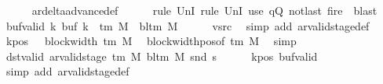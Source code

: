 \begin{isabellebody}
\ \ \ \ \isamarkupfalse%
\ ar{\isacharunderscore}{\kern0pt}delta{\isacharunderscore}{\kern0pt}advance{\isacharunderscore}{\kern0pt}def\isanewline
\ \ \ \ \isamarkupfalse%
\ {\isacharparenleft}{\kern0pt}rule\ UnI{}{\isacharcomma}{\kern0pt}\ rule\ UnI{}{\isacharparenright}{\kern0pt}\ {\isacharparenleft}{\kern0pt}use\ qQ\ notlast\ fire{\isacharprime}{\kern0pt}\ \ blast{\isacharparenright}{\kern0pt}\isanewline
\ \ \isamarkupfalse%
\ buf{\isacharunderscore}{\kern0pt}valid{\isacharcolon}{\kern0pt}\ {\isachardoublequoteopen}{\isasymforall}k{\isachardot}{\kern0pt}\ buf\ k\ {\isasymin}\ {\isasymGamma}{\isacharunderscore}{\kern0pt}tm\ M\ {\isasymunion}\ {\isacharbraceleft}{\kern0pt}bl{\isacharunderscore}{\kern0pt}tm\ M{\isacharbraceright}{\kern0pt}{\isachardoublequoteclose}\isanewline
\ \ \ \ \isamarkupfalse%
\ vsrc\ \isamarkupfalse%
\ {\isacharparenleft}{\kern0pt}simp\ add{\isacharcolon}{\kern0pt}\ ar{\isacharunderscore}{\kern0pt}valid{\isacharunderscore}{\kern0pt}stage{\isacharunderscore}{\kern0pt}def{\isacharparenright}{\kern0pt}\isanewline
\ \ \isamarkupfalse%
\ kpos{\isacharcolon}{\kern0pt}\ {\isachardoublequoteopen}{}\ {\isacharless}{\kern0pt}\ block{\isacharunderscore}{\kern0pt}width\ {\isacharparenleft}{\kern0pt}{\isasymGamma}{\isacharunderscore}{\kern0pt}tm\ M{\isacharparenright}{\kern0pt}{\isachardoublequoteclose}\ \isamarkupfalse%
\ block{\isacharunderscore}{\kern0pt}width{\isacharunderscore}{\kern0pt}pos{\isacharbrackleft}{\kern0pt}of\ {\isachardoublequoteopen}{\isasymGamma}{\isacharunderscore}{\kern0pt}tm\ M{\isachardoublequoteclose}{\isacharbrackright}{\kern0pt}\ \isamarkupfalse%
\ simp\isanewline
\ \ \isamarkupfalse%
\ dst{\isacharunderscore}{\kern0pt}valid{\isacharcolon}{\kern0pt}\ {\isachardoublequoteopen}ar{\isacharunderscore}{\kern0pt}valid{\isacharunderscore}{\kern0pt}stage\ {\isacharparenleft}{\kern0pt}{\isasymGamma}{\isacharunderscore}{\kern0pt}tm\ M{\isacharparenright}{\kern0pt}\ {\isacharparenleft}{\kern0pt}bl{\isacharunderscore}{\kern0pt}tm\ M{\isacharparenright}{\kern0pt}\ {\isacharparenleft}{\kern0pt}snd\ {\isacharquery}{\kern0pt}s{\isacharprime}{\kern0pt}{\isacharparenright}{\kern0pt}{\isachardoublequoteclose}\isanewline
\ \ \ \ \isamarkupfalse%
\ kpos\ buf{\isacharunderscore}{\kern0pt}valid\ \isamarkupfalse%
\ {\isacharparenleft}{\kern0pt}simp\ add{\isacharcolon}{\kern0pt}\ ar{\isacharunderscore}{\kern0pt}valid{\isacharunderscore}{\kern0pt}stage{\isacharunderscore}{\kern0pt}def{\isacharparenright}{\kern0pt}\isanewline

\end{isabellebody}
